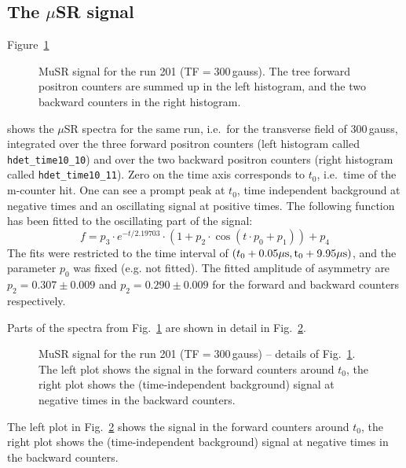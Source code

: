 \documentclass[twoside]{dis04}
\begin{document}
\subsection{The $\mu$SR signal}
%
Figure~\ref{hdet_time10_10}
%
\begin{figure}[htbp]\centering
{}
\caption{MuSR signal for the run 201 (TF$=300\,$gauss). The tree forward positron counters 
are summed up in the left histogram, and the two backward counters in the right histogram.}
\label{hdet_time10_10}
\end{figure}
%
shows the $\mu$SR spectra for the same run, 
i.e.\ for the transverse field of 300\,gauss, integrated over the three forward positron
counters (left histogram called {\tt hdet\_time10\_10}) 
and over the two backward positron counters (right histogram called {\tt hdet\_time10\_11}).
Zero on the time axis corresponds to $t_0$, i.e.\ time of the m-counter hit.
One can see a prompt peak at $t_0$, time independent background at negative times
and an oscillating signal at positive times.
The following function has been fitted to the oscillating part of the signal:
%
\begin{equation}
f=p_3 \cdot e^{-t/2.19703} \cdot (1+p_2 \cdot \cos(t \cdot p_0+p_1))+p_4
\label{eq_simple}
\end{equation}
The fits were restricted to the time interval of $(t_0+0.05 \mu\rm{s},t_0+9.95\mu\rm{s})$,
and the parameter $p_0$ was fixed (e.g. not fitted).
The fitted amplitude of asymmetry are $p_2 = 0.307 \pm 0.009$ and 
$p_2 = 0.290 \pm 0.009$ for the forward and backward counters respectively.

Parts of the spectra from Fig.~\ref{hdet_time10_10} are shown 
in detail in Fig.~\ref{hdet_time10_10_detail}.
%
\begin{figure}[htbp]\centering
{}
\caption{MuSR signal for the run 201 (TF$=300\,$gauss) -- details of
Fig.~\ref{hdet_time10_10}. The left plot shows the signal in the forward counters around $t_0$,
the right plot shows the (time-independent background) signal at negative times in the
backward counters.}
\label{hdet_time10_10_detail}
\end{figure}
%
The left plot in Fig.~\ref{hdet_time10_10_detail} shows the signal 
in the forward counters around $t_0$, the right plot shows the 
(time-independent background) signal at negative times in the backward counters.
\end{document}
